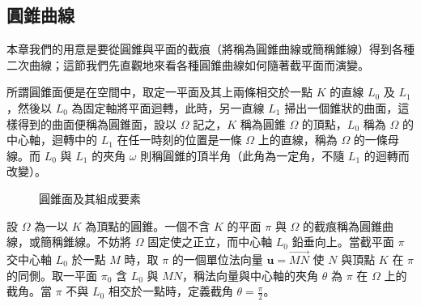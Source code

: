 \subsection{圓錐曲線}
\label{sec:b4-2-3}

本章我們的用意是要從圓錐與平面的截痕（將稱為圓錐曲線或簡稱錐線）得到各種二次曲線；這節我們先直觀地來看各種圓錐曲線如何隨著截平面而演變。

\begin{definition}[定義]
所謂圓錐面便是在空間中，取定一平面及其上兩條相交於一點 $K$ 的直線 $L_0$ 及 $L_1$，然後以 $L_0$ 為固定軸將平面迴轉，此時，另一直線 $L_1$ 掃出一個錐狀的曲面，這樣得到的曲面便稱為圓錐面，設以 $\Omega$ 記之，$K$ 稱為圓錐 $\Omega$ 的頂點，$L_0$ 稱為 $\Omega$ 的中心軸，迴轉中的 $L_1$ 在任一時刻的位置是一條 $\Omega$ 上的直線，稱為 $\Omega$ 的一條母線。而 $L_0$ 與 $L_1$ 的夾角 $\omega$ 則稱圓錐的頂半角（此角為一定角，不隨 $L_1$ 的迴轉而改變）。
\end{definition}

\begin{figure}[H]
\centering
{}
\caption{圓錐面及其組成要素}
\label{fig:b4-2-3-1}
\end{figure}

\begin{definition}[定義]
設 $\Omega$ 為一以 $K$ 為頂點的圓錐。一個不含 $K$ 的平面 $\pi$ 與 $\Omega$ 的截痕稱為圓錐曲線，或簡稱錐線。不妨將 $\Omega$ 固定使之正立，而中心軸 $L_0$ 鉛垂向上。當截平面 $\pi$ 交中心軸 $L_0$ 於一點 $M$ 時，取 $\pi$ 的一個單位法向量 $\mathbf{u} = \vec{MN}$ 使 $N$ 與頂點 $K$ 在 $\pi$ 的同側。取一平面 $\pi_0$ 含 $L_0$ 與 $MN$，稱法向量與中心軸的夾角 $\theta$ 為 $\pi$ 在 $\Omega$ 上的截角。當 $\pi$ 不與 $L_0$ 相交於一點時，定義截角 $\theta = \frac{\pi}{2}$。
\end{definition}

